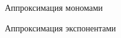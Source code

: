 \documentclass[a4paper]{article}
\begin{document}
\begin{figure}[h!]
  \noindent{}
  \caption{Аппроксимация мономами}
  \label{monex}
\end{figure}

\begin{figure}[h!]
  \noindent{}
  \caption{Аппроксимация экспонентами}
  \label{expex}
\end{figure}
\end{document}
